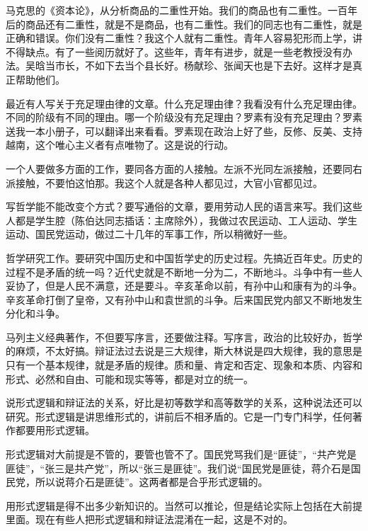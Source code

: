 马克思的《资本论》，从分析商品的二重性开始。我们的商品也有二重性。一百年后的商品还有二重性，就是不是商品，也有二重性。我们的同志也有二重性，就是正确和错误。你们没有二重性？我这个人就有二重性。青年人容易犯形而上学，讲不得缺点。有了一些阅历就好了。这些年，青年有进步，就是一些老教授没有办法。吴晗当市长，不如下去当个县长好。杨献珍、张闻天也是下去好。这样才是真正帮助他们。

最近有人写关于充足理由律的文章。什么充足理由律？我看没有什么充足理由律。不同的阶级有不同的理由。哪一个阶级没有充足理由？罗素有没有充足理由？罗素送我一本小册子，可以翻译出来看看。罗素现在政治上好了些，反修、反美、支持越南，这个唯心主义者有点唯物了。这是说的行动。

一个人要做多方面的工作，要同各方面的人接触。左派不光同左派接触，还要同右派接触，不要怕这怕那。我这个人就是各种人都见过，大官小官都见过。

写哲学能不能改变个方式？要写通俗的文章，要用劳动人民的语言来写。我们这些人都是学生腔（陈伯达同志插话：主席除外），我做过农民运动、工人运动、学生运动、国民党运动，做过二十几年的军事工作，所以稍微好一些。

哲学研究工作。要研究中国历史和中国哲学史的历史过程。先搞近百年史。历史的过程不是矛盾的统一吗？近代史就是不断地一分为二，不断地斗。斗争中有一些人妥协了，但是人民不满意，还是要斗。辛亥革命以前，有孙中山和康有为的斗争。辛亥革命打倒了皇帝，又有孙中山和袁世凯的斗争。后来国民党内部又不断地发生分化和斗争。

马列主义经典著作，不但要写序言，还要做注释。写序言，政治的比较好办，哲学的麻烦，不太好搞。辩证法过去说是三大规律，斯大林说是四大规律，我的意思是只有一个基本规律，就是矛盾的规律。质和量、肯定和否定、现象和本质、内容和形式、必然和自由、可能和现实等等，都是对立的统一。

说形式逻辑和辩证法的关系，好比是初等数学和高等数学的关系，这种说法还可以研究。形式逻辑是讲思维形式的，讲前后不相矛盾的。它是一门专门科学，任何著作都要用形式逻辑。

形式逻辑对大前提是不管的，要管也管不了。国民党骂我们是“匪徒”，“共产党是匪徒”，“张三是共产党”，所以“张三是匪徒”。我们说“国民党是匪徒，蒋介石是国民党，所以说蒋介石是匪徒”。这两者都是合乎形式逻辑的。

用形式逻辑是得不出多少新知识的。当然可以推论，但是结论实际上包括在大前提里面。现在有些人把形式逻辑和辩证法混淆在一起，这是不对的。

